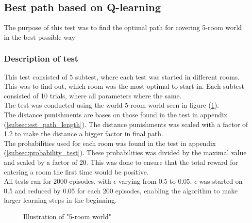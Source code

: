 \documentclass[../Head/Main.tex]{subfiles}
\begin{document}
\subsection{Best path based on Q-learning}
\label{subsec:test_best_path}
The purpose of this test was to find the optimal path for covering 5-room world in the best possible way
\subsubsection*{Description of test}
This test consisted of 5 subtest, where each test was started in different rooms. This was to find out, which room was the most optimal to start in. Each subtest consisted of 10 trials, where all parameters where the same.\\
The test was conducted using the world 5-room world seen in figure (\ref{fig:5_room_world_path}).\\
The distance punishments are bases on those found in the test in appendix (\ref{subsec:est_path_length}). The distance punishments was scaled with a factor of 1.2 to make the distance a bigger factor in final path.\\
The probabilities used for each room was found in the test in appendix (\ref{subsec:probability_test}). These probabilities was divided by the maximal value and scaled by a factor of 20. This was done to ensure that the total reward for entering a room the first time would be positive.\\
All tests ran for 2000 episodes, with $\epsilon$ varying from 0.5 to 0.05. $\epsilon$ was started on 0.5 and reduced by 0.05 for each 200 episodes, enabling the algorithm to make larger learning steps in the beginning.  
\begin{figure}[H]
	\centering
		
	\caption{Illustration of "5-room world"}
	\label{fig:5_room_world_path}
\end{figure}
\end{document}
